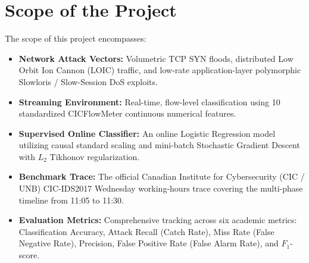 \documentclass[12pt,a4paper,oneside]{report}
\begin{document}
\section{Scope of the Project}
The scope of this project encompasses:
\begin{itemize}
    \item \textbf{Network Attack Vectors:} Volumetric TCP SYN floods, distributed Low Orbit Ion Cannon (LOIC) traffic, and low-rate application-layer polymorphic Slowloris / Slow-Session DoS exploits.
    \item \textbf{Streaming Environment:} Real-time, flow-level classification using 10 standardized CICFlowMeter continuous numerical features.
    \item \textbf{Supervised Online Classifier:} An online Logistic Regression model utilizing causal standard scaling and mini-batch Stochastic Gradient Descent with $L_2$ Tikhonov regularization.
    \item \textbf{Benchmark Trace:} The official Canadian Institute for Cybersecurity (CIC / UNB) CIC-IDS2017 Wednesday working-hours trace covering the multi-phase timeline from 11:05 to 11:30.
    \item \textbf{Evaluation Metrics:} Comprehensive tracking across six academic metrics: Classification Accuracy, Attack Recall (Catch Rate), Miss Rate (False Negative Rate), Precision, False Positive Rate (False Alarm Rate), and $F_1$-score.
\end{itemize}
\end{document}
